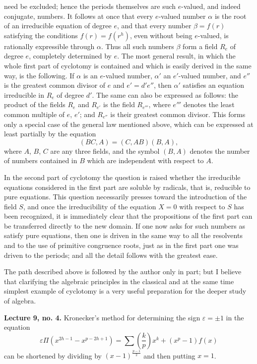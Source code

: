 \documentclass[11pt]{article}
\newcommand{\origpage}[1]{\par\vspace{0.25em}\noindent{\footnotesize\itshape [Printed page #1]}\par\vspace{0.25em}}
\begin{document}
\origpage{416}
need be excluded; hence the periods themselves are such $e$-valued, and indeed conjugate, numbers. It follows at once that every $e$-valued number $\alpha$ is the root of an irreducible equation of degree $e$, and that every number $\beta=f(r)$ satisfying the conditions $f(r)=f(r^h)$, even without being $e$-valued, is rationally expressible through $\alpha$. Thus all such numbers $\beta$ form a field $R_e$ of degree $e$, completely determined by $e$. The most general result, in which the whole first part of cyclotomy is contained and which is easily derived in the same way, is the following. If $\alpha$ is an $e$-valued number, $\alpha'$ an $e'$-valued number, and $e''$ is the greatest common divisor of $e$ and $e'=d'e''$, then $\alpha'$ satisfies an equation irreducible in $R_e$ of degree $d'$. The same can also be expressed as follows: the product of the fields $R_e$ and $R_{e'}$ is the field $R_{e'''}$, where $e'''$ denotes the least common multiple of $e$, $e'$; and $R_{e''}$ is their greatest common divisor. This forms only a special case of the general law mentioned above, which can be expressed at least partially by the equation
\[
 (BC,A)=(C,AB)(B,A),
\]
where $A$, $B$, $C$ are any three fields, and the symbol $(B,A)$ denotes the number of numbers contained in $B$ which are independent with respect to $A$.

In the second part of cyclotomy the question is raised whether the irreducible equations considered in the first part are soluble by radicals, that is, reducible to pure equations. This question necessarily presses toward the introduction of the field $S$, and once the irreducibility of the equation $X=0$ with respect to $S$ has been recognized, it is immediately clear that the propositions of the first part can be transferred directly to the new domain. If one now asks for such numbers as satisfy pure equations, then one is driven in the same way to all the resolvents and to the use of primitive congruence roots, just as in the first part one was driven to the periods; and all the detail follows with the greatest ease.

The path described above is followed by the author only in part; but I believe that clarifying the algebraic principles in the classical and at the same time simplest example of cyclotomy is a very useful preparation for the deeper study of algebra.

\origpage{417}
\textbf{Lecture 9, no. 4.} Kronecker's method for determining the sign $\varepsilon=\pm1$ in the equation
\[
 \varepsilon\Pi(x^{2h-1}-x^{p-2h+1})=
 \sum \left(\frac{k}{p}\right)x^k+(x^p-1)f(x)
\]
can be shortened by dividing by $(x-1)^{\frac{p-1}{2}}$ and then putting $x=1$.
\end{document}
